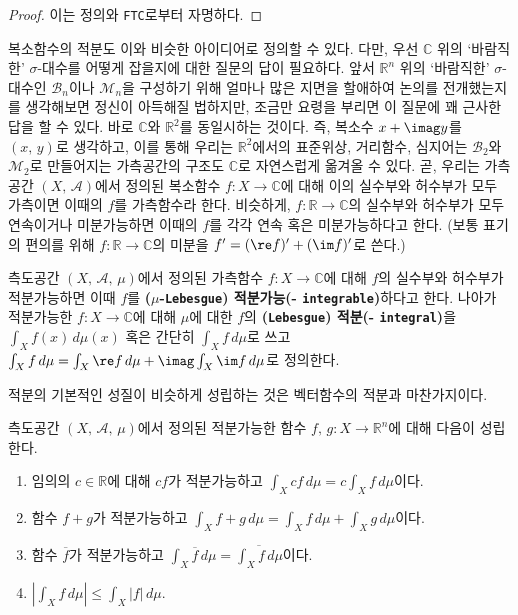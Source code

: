 \begin{proof}
    이는 정의와 \texttt{FTC}로부터 자명하다.
\end{proof}

복소함수의 적분도 이와 비슷한 아이디어로 정의할 수 있다. 다만, 우선 $\mathbb{C}$ 위의 `바람직한' $\sigma$-대수를 어떻게 잡을지에 대한 질문의 답이 필요하다. 앞서 $\mathbb{R}^n$ 위의 `바람직한' $\sigma$-대수인 $\mathcal{B}_n$이나 $\mathcal{M}_n$을 구성하기 위해 얼마나 많은 지면을 할애하여 논의를 전개했는지를 생각해보면 정신이 아득해질 법하지만, 조금만 요령을 부리면 이 질문에 꽤 근사한 답을 할 수 있다. 바로 $\mathbb{C}$와 $\mathbb{R}^2$를 동일시하는 것이다. 즉, 복소수 $x+\imag y$를 $(x,\,y)$로 생각하고, 이를 통해 우리는 $\mathbb{R}^2$에서의 표준위상, 거리함수, 심지어는 $\mathcal{B}_2$와 $\mathcal{M}_2$로 만들어지는 가측공간의 구조도 $\mathbb{C}$로 자연스럽게 옮겨올 수 있다. 곧, 우리는 가측공간 $(X,\,\mathcal{A})$에서 정의된 복소함수 $f:X\to\mathbb{C}$에 대해 이의 실수부와 허수부가 모두 가측이면 이때의 $f$를 가측함수라 한다. 비슷하게, $f:\mathbb{R}\to\mathbb{C}$의 실수부와 허수부가 모두 연속이거나 미분가능하면 이때의 $f$를 각각 연속 혹은 미분가능하다고 한다. (보통 표기의 편의를 위해 $f:\mathbb{R}\to\mathbb{C}$의 미분을 $f'=(\re f)'+(\im f)'$로 쓴다.)

\begin{definition}
    측도공간 $(X,\,\mathcal{A},\,\mu)$에서 정의된 가측함수 $f:X\to\mathbb{C}$에 대해 $f$의 실수부와 허수부가 적분가능하면 이때 $f$를 \textbf{($\mu$-\texttt{Lebesgue}) 적분가능(- \texttt{integrable})}하다고 한다. 나아가 적분가능한 $f:X\to\mathbb{C}$에 대해 $\mu$에 대한 $f$의 \textbf{(\texttt{Lebesgue}) 적분(- \texttt{integral})}을 $\int_Xf(x)\,d\mu(x)$ 혹은 간단히 $\int_Xf\,d\mu$로 쓰고 $\int_Xf\,d\mu=\int_X\re f\,d\mu+\imag\int_X\im f\,d\mu$로 정의한다.
\end{definition}

적분의 기본적인 성질이 비슷하게 성립하는 것은 벡터함수의 적분과 마찬가지이다.

\begin{corollary}
    측도공간 $(X,\,\mathcal{A},\,\mu)$에서 정의된 적분가능한 함수 $f,\,g:X\to\mathbb{R}^n$에 대해 다음이 성립한다.
    \begin{enumerate}
        \item 임의의 $c\in\mathbb{R}$에 대해 $cf$가 적분가능하고 $\int_Xcf\,d\mu=c\int_Xf\,d\mu$이다.
        \item 함수 $f+g$가 적분가능하고 $\int_Xf+g\,d\mu=\int_Xf\,d\mu+\int_Xg\,d\mu$이다.
        \item 함수 $\overline{f}$가 적분가능하고 $\int_X\overline{f}\,d\mu=\overline{\int_Xf\,d\mu}$이다.
        \item $|\int_Xf\,d\mu|\leq\int_X|f|\,d\mu$.
    \end{enumerate}
\end{corollary}

